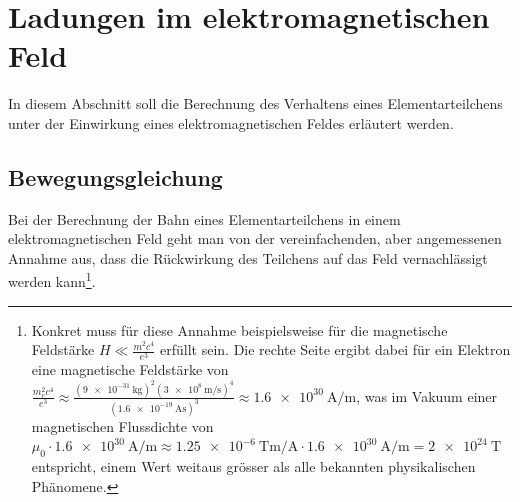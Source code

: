 
\section{Ladungen im elektromagnetischen Feld
\label{relativ:section:em_feld}}

In diesem Abschnitt soll die Berechnung des Verhaltens eines Elementarteilchens
unter der Einwirkung eines elektromagnetischen Feldes erläutert werden.


\subsection{Bewegungsgleichung
\label{relativ:section:bewegungsgleichung}}

Bei der Berechnung der Bahn eines Elementarteilchens
in einem elektromagnetischen Feld geht man von
der vereinfachenden, aber angemessenen Annahme aus,
dass die Rückwirkung des Teilchens auf das Feld vernachlässigt werden kann\footnote{
Konkret muss für diese Annahme beispielsweise
für die magnetische Feldstärke
\(H \ll \frac{m^2c^4}{e^3}\) erfüllt sein.
Die rechte Seite ergibt dabei für ein Elektron
eine magnetische Feldstärke von
\(\frac{m_e^2c^4}{e^3} \approx
\frac{(\qty{9e-31}{\kilogram})^2 (\qty{3e8}{\metre\per\second})^4}{(\qty{1.6e-19}{\ampere\second})^3}
\approx \qty[per-mode=fraction]{1.6e30}{\ampere\per\metre}\),
was im Vakuum einer magnetischen Flussdichte von
\(\mu_0 \cdot \qty[per-mode=fraction]{1.6e30}{\ampere\per\metre} \approx
\qty[per-mode=fraction]{1.25e-6}{\tesla\metre\per\ampere} \cdot
\qty[per-mode=fraction]{1.6e30}{\ampere\per\metre} =
\qty{2e24}{\tesla}\)
entspricht, einem Wert weitaus grösser als alle bekannten physikalischen Phänomene.}.

